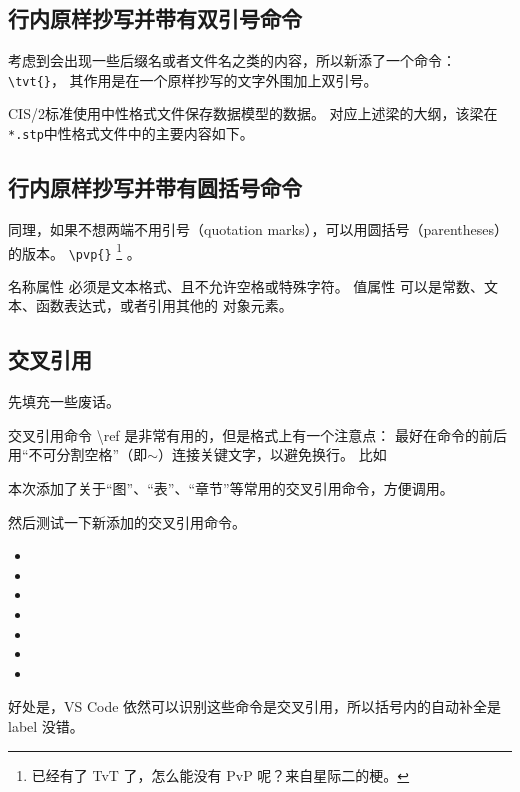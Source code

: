 \documentclass[../Main/thesis]{subfiles}
\begin{document}
\subsection{行内原样抄写并带有双引号命令}
\label{ssc:tvt}

考虑到会出现一些后缀名或者文件名之类的内容，所以新添了一个命令：
\verb|\tvt{}|，
其作用是在一个原样抄写的文字外围加上双引号。

CIS/2标准使用中性格式文件保存数据模型的数据。
对应上述梁的大纲，该梁在\texttt{*.stp}中性格式文件中的主要内容如下。

\subsection{行内原样抄写并带有圆括号命令}
\label{ssc:pvp}

同理，如果不想两端不用引号（quotation marks），可以用圆括号（parentheses）的版本。
\verb|\pvp{}|
\footnote{已经有了 TvT 了，怎么能没有 PvP 呢？来自星际二的梗。}
。

名称属性  必须是文本格式、且不允许空格或特殊字符。
值属性  可以是常数、文本、函数表达式，或者引用其他的 对象元素。

\subsection{交叉引用}
\label{ssc:cross-ref-cmd}

先填充一些废话。\zhlipsum[10]

交叉引用命令 \textbackslash ref 是非常有用的，但是格式上有一个注意点：
最好在命令的前后用“不可分割空格”（即$\sim$）连接关键文字，以避免换行。
比如

本次添加了关于“图”、“表”、“章节”等常用的交叉引用命令，方便调用。

然后测试一下新添加的交叉引用命令。
\begin{itemize}[\textbullet]
  \item {}
  \item {}
  \item {}
  \item {}
  \item {}
  \item {}
  \item {}
\end{itemize}

好处是，VS Code 依然可以识别这些命令是交叉引用，所以括号内的自动补全是 label 没错。
\end{document}
